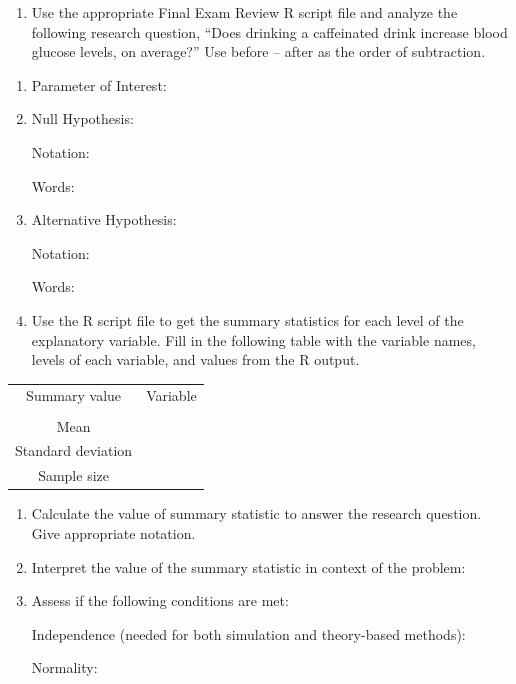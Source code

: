 \documentclass[
]{report}
\providecommand{\tightlist}{%
  \setlength{\itemsep}{0pt}\setlength{\parskip}{0pt}}
\begin{document}
\newpage

\begin{enumerate}
\def\labelenumi{\arabic{enumi}.}
\tightlist
\item
  Use the appropriate Final Exam Review R script file and analyze the following research question, ``Does drinking a caffeinated drink increase blood glucose levels, on average?'' Use before -- after as the order of subtraction.
\end{enumerate}

\begin{enumerate}
\def\labelenumi{\alph{enumi}.}
\item
  Parameter of Interest:
  \vspace{0.3in}
\item
  Null Hypothesis:

  Notation:
  \vspace{0.3in}

  Words:
  \vspace{0.5in}
\item
  Alternative Hypothesis:

  Notation:
  \vspace{0.3in}

  Words:
  \vspace{0.5in}
\item
  Use the R script file to get the summary statistics for each level of the explanatory variable. Fill in the following table with the variable names, levels of each variable, and values from the R output.
\end{enumerate}

\begingroup
\setlength{\tabcolsep}{14pt}
\renewcommand{\arraystretch}{2}
\begin{center}
\begin{tabular}{|c|p{1in}|}
\hline
 Summary value & Variable \\
 & \\ \hline
 Mean &  \\ \hline
 Standard deviation & \\ \hline
 Sample size & \\ \hline
\end{tabular}
\end{center}
\endgroup

\begin{enumerate}
\def\labelenumi{\alph{enumi}.}
\setcounter{enumi}{4}
\item
  Calculate the value of summary statistic to answer the research question. Give appropriate notation.
  \vspace{0.3in}
\item
  Interpret the value of the summary statistic in context of the problem:
  \vspace{0.3in}
\item
  Assess if the following conditions are met:

  Independence (needed for both simulation and theory-based methods):
  \vspace{0.8in}

  Normality:
\end{enumerate}
\end{document}
